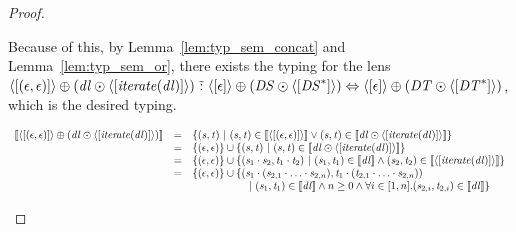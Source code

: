 \documentclass[acmsmall]{acmart}
\begin{document}
\begin{proof}
\begin{case}[\AtomUnrollstarLeftRule{}]
    Because of this, by Lemma~\ref{lem:typ_sem_concat} and
    Lemma~\ref{lem:typ_sem_or}, there exists the typing
    for the lens
    $\langle[(\epsilon,\epsilon)]\rangle \oplus
    (\mathit{dl} \odot \langle[\mathit{\mathit{iterate}(\mathit{dl})}]\rangle)
    \,\,\tilde{:}\,\,
    \langle[\epsilon]\rangle \oplus (\mathit{DS} \odot
    \langle[{\mathit{DS}}^*]\rangle) \Leftrightarrow
    \langle[\epsilon]\rangle \oplus (\mathit{DT} \odot
    \langle[{\mathit{DT}}^*]\rangle)$, which is the desired typing.

    \[
      \begin{array}{rcl}
        \SemanticsOf{\DNFLensOf{\SequenceLensOf{(\EmptyString,\EmptyString)}}
        \OrDNFLens
        (\DNFLens \ConcatDNFLens
        \DNFLensOf{\SequenceLensOf{\IterateLensOf{\DNFLens}}})}
        & = & \SetOf{(\String,\StringAlt)\SuchThat
              (\String,\StringAlt)\in\SemanticsOf{\DNFLensOf{\SequenceLensOf{
              (\EmptyString,\EmptyString)}}} \BooleanOr (\String,\StringAlt)
              \in \SemanticsOf{\DNFLens \ConcatDNFLens
              \DNFLensOf{\SequenceLensOf{\IterateLensOf{\DNFLens}}}}}\\
        & = & \SetOf{(\EmptyString,\EmptyString)} \Union
              \SetOf{(\String,\StringAlt) \SuchThat (\String,\StringAlt) \in
              \SemanticsOf{\DNFLens \ConcatDNFLens
              \DNFLensOf{\SequenceLensOf{\IterateLensOf{\DNFLens}}}}}\\
        & = & \SetOf{(\EmptyString,\EmptyString)} \Union
              \SetOf{(\String_1\Concat\String_2,\StringAlt_1\Concat\StringAlt_2)
              \SuchThat (\String_1,\StringAlt_1) \in
              \SemanticsOf{\DNFLens} \BooleanAnd
              (\String_2,\StringAlt_2) \in
              \SemanticsOf{\DNFLensOf{\SequenceLensOf{\IterateLensOf{\DNFLens}}}}}\\
        & = & \SetOf{(\EmptyString,\EmptyString)} \Union
              \SetOf{(\String_1\Concat
              (\String_{2,1}\Concat\ldots\Concat\String_{2,n}),
              \StringAlt_1\Concat
              (\StringAlt_{2,1}\Concat\ldots\Concat\String_{2,n}))\\
        & & \hspace*{5em}
            \SuchThat (\String_1,\StringAlt_1) \in
            \SemanticsOf{\DNFLens} \BooleanAnd n\geq 0 \BooleanAnd
            \forall i\in\RangeIncInc{1}{n}.(\String_{2,i},\StringAlt_{2,i}) \in
            \SemanticsOf{\DNFLens}}\\

\end{array}\]
\end{case}
\end{proof}
\end{document}
